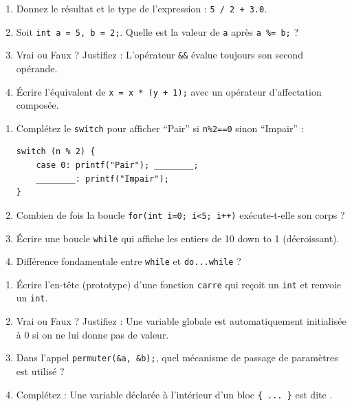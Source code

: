 \documentclass[11pt]{article}
\begin{document}
\begin{exercice}
\begin{enumerate}
    \item Donnez le résultat et le type de l'expression : \texttt{5 / 2 + 3.0}.
    \item Soit \texttt{int a = 5, b = 2;}. Quelle est la valeur de \texttt{a} après \texttt{a \%= b;} ?
    \item Vrai ou Faux ? Justifiez : L'opérateur \texttt{\&\&} évalue toujours son second opérande.
    \item Écrire l'équivalent de \texttt{x = x * (y + 1);} avec un opérateur d'affectation composée.
\end{enumerate}
\end{exercice}

\begin{exercice}
\begin{enumerate}
    \item Complétez le \texttt{switch} pour afficher ``Pair'' si \texttt{n\%2==0} sinon ``Impair'' :
\begin{verbatim}
switch (n % 2) {
    case 0: printf("Pair"); ________;
    ________: printf("Impair");
}
\end{verbatim}
    \item Combien de fois la boucle \texttt{for(int i=0; i<5; i++)} exécute-t-elle son corps ?
    \item Écrire une boucle \texttt{while} qui affiche les entiers de 10 down to 1 (décroissant).
    \item Différence fondamentale entre \texttt{while} et \texttt{do...while} ?
\end{enumerate}
\end{exercice}

\begin{exercice}
\begin{enumerate}
    \item Écrire l'en-tête (prototype) d'une fonction \texttt{carre} qui reçoit un \texttt{int} et renvoie un \texttt{int}.
    \item Vrai ou Faux ? Justifiez : Une variable globale est automatiquement initialisée à 0 si on ne lui donne pas de valeur.
    \item Dans l'appel \texttt{permuter(\&a, \&b);}, quel mécanisme de passage de paramètres est utilisé ?
    \item Complétez : Une variable déclarée à l'intérieur d'un bloc \texttt{\{ ... \}} est dite \underline{\hspace{3cm}}.
\end{enumerate}
\end{exercice}
\end{document}
